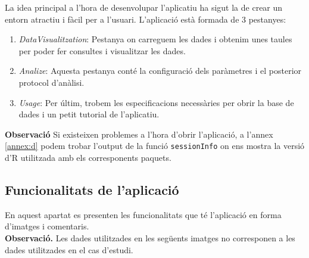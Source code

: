 \documentclass[english]{article}
\begin{document}
La idea principal a l'hora de desenvolupar l'aplicatiu ha sigut la de crear un entorn atractiu i fàcil per a l'usuari. L'aplicació està formada de 3 pestanyes:
\begin{enumerate}
\item \textit{DataVisualitzation}: Pestanya on carreguem les dades i obtenim unes taules per poder fer consultes i visualitzar les dades.
\item \textit{Analize}: Aquesta pestanya conté la configuració dels paràmetres i el posterior protocol d'anàlisi.
\item \textit{Usage}: Per últim, trobem les especificacions necessàries per obrir la base de dades i un petit tutorial de l'aplicatiu.
\end{enumerate}

\textbf{Observació} Si existeixen problemes a l'hora d'obrir l'aplicació, a l'annex \ref{annex:d} podem trobar l'output de la funció \texttt{sessionInfo} on ens mostra la versió d'R utilitzada amb els corresponents paquets.
\clearpage
\subsection{Funcionalitats de l'aplicació}
En aquest apartat es presenten les funcionalitats que té l'aplicació en forma d'imatges i comentaris.
\\

\textbf{Observació.} Les dades utilitzades en les següents imatges no corresponen a les dades utilitzades en el cas d'estudi.
\end{document}
